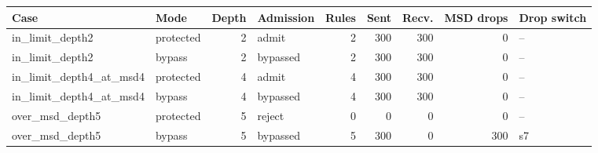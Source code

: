 \begin{tabular}{@{}llrlrrrrl@{}}
\toprule
Case & Mode & Depth & Admission & Rules & Sent & Recv. & MSD drops & Drop switch \\
\midrule
in\_limit\_depth2 & protected & 2 & admit & 2 & 300 & 300 & 0 & -- \\
in\_limit\_depth2 & bypass & 2 & bypassed & 2 & 300 & 300 & 0 & -- \\
in\_limit\_depth4\_at\_msd4 & protected & 4 & admit & 4 & 300 & 300 & 0 & -- \\
in\_limit\_depth4\_at\_msd4 & bypass & 4 & bypassed & 4 & 300 & 300 & 0 & -- \\
over\_msd\_depth5 & protected & 5 & reject & 0 & 0 & 0 & 0 & -- \\
over\_msd\_depth5 & bypass & 5 & bypassed & 5 & 300 & 0 & 300 & s7 \\
\bottomrule
\end{tabular}
